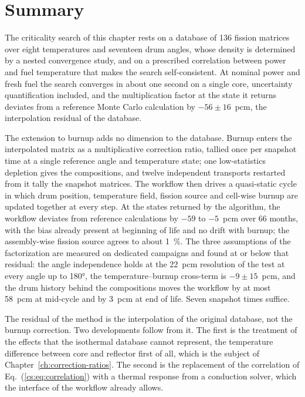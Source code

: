 \section{Summary}

The criticality search of this chapter rests on a database of 136 fission
matrices over eight temperatures and seventeen drum angles, whose density is
determined by a nested convergence study, and on a prescribed correlation between
power and fuel temperature that makes the search self-consistent.
At nominal power and fresh fuel the search converges in about one second on a
single core, uncertainty quantification included, and the multiplication
factor at the state it returns deviates from a reference Monte Carlo
calculation by $-56\pm16$~pcm, the interpolation residual of the database.

The extension to burnup adds no dimension to the database. Burnup enters the
interpolated matrix as a multiplicative correction ratio, tallied once per
snapshot time at a single reference angle and temperature state; one
low-statistics depletion gives the compositions, and twelve independent
transports restarted from it tally the snapshot matrices. The workflow then
drives a quasi-static cycle in which drum position, temperature field, fission
source and cell-wise burnup are updated together at every step. At the states
returned by the algorithm, the workflow deviates from reference calculations
by $-59$ to $-5$~pcm over 66 months, with the bias already present at
beginning of life and no drift with burnup; the assembly-wise
fission source agrees to about \SI{1}{\percent}. The three assumptions of the
factorization are measured on dedicated campaigns and found at or below that
residual: the angle independence holds at the \SI{22}{pcm} resolution of the
test at every angle up to \ang{180}, the temperature--burnup cross-term is
$-9\pm15$~pcm, and the drum history behind the compositions moves the
workflow by at most \SI{58}{pcm} at mid-cycle and by \SI{3}{pcm} at end of
life. Seven snapshot times suffice.

The residual of the method is the interpolation of the original database, not
the burnup correction. Two developments follow from it. The first is the
treatment of the effects that the isothermal database cannot represent, the
temperature difference between core and reflector first of all, which is the
subject of Chapter~\ref{ch:correction-ratios}. The second is the replacement
of the correlation of Eq.~(\ref{cs:eq:correlation}) with a thermal response
from a conduction solver, which the interface of the workflow already allows.
